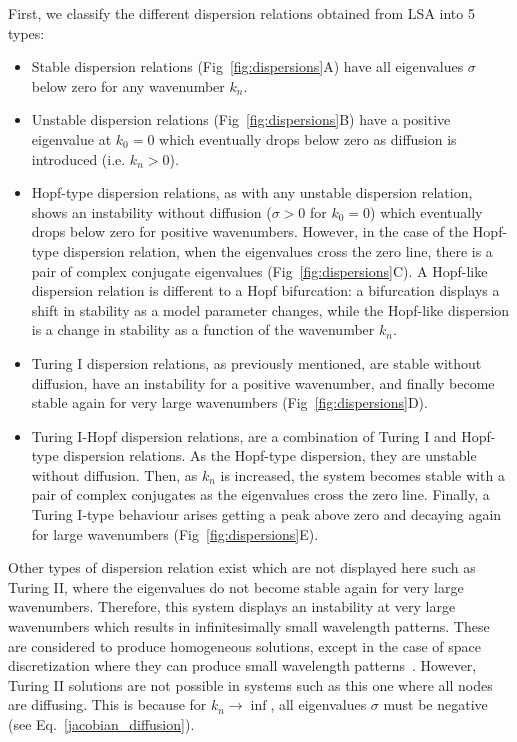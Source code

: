 First, we classify the different dispersion relations obtained from LSA into 5 types:
\begin{itemize}
    \item Stable dispersion relations (Fig~\ref{fig:dispersions}A) have all eigenvalues $\sigma$ below zero for any wavenumber $k_{n}$.
    \item Unstable dispersion relations (Fig~\ref{fig:dispersions}B) have a positive eigenvalue at $k_{0}=0$ which eventually drops below zero as diffusion is introduced (i.e. $k_{n}>0$).
    \item Hopf-type dispersion relations, as with any unstable dispersion relation, shows an instability without diffusion ($\sigma>0$ for $k_{0}=0$) which eventually drops below zero for positive wavenumbers.
However, in the case of the Hopf-type dispersion relation, when the eigenvalues cross the zero line, there is a pair of complex conjugate eigenvalues (Fig~\ref{fig:dispersions}C).
A Hopf-like dispersion relation is different to a Hopf bifurcation: a bifurcation displays a shift in stability as a model parameter changes, while the Hopf-like dispersion is a change in stability as a function of the wavenumber $k_{n}$.
\item Turing I dispersion relations, as previously mentioned, are stable without diffusion, have an instability for a positive wavenumber, and finally become stable again for very large wavenumbers (Fig~\ref{fig:dispersions}D).
    \item Turing I-Hopf dispersion relations, are a combination of Turing I and Hopf-type dispersion relations.
As the Hopf-type dispersion, they are unstable without diffusion.
Then, as $k_{n}$ is increased, the system becomes stable with a pair of complex conjugates as the eigenvalues cross the zero line.
Finally, a Turing I-type behaviour arises getting a peak above zero and decaying again for large wavenumbers (Fig~\ref{fig:dispersions}E).
\end{itemize}
Other types of dispersion relation exist which are not displayed here such as Turing II, where the eigenvalues do not become stable again for very large wavenumbers.
Therefore, this system displays an instability at very large wavenumbers which results in infinitesimally small wavelength patterns.
These are considered to produce homogeneous solutions, except in the case of space discretization where they can produce small wavelength patterns~\parencite{Wang2022}.
However, Turing II solutions are not possible in systems such as this one where all nodes are diffusing.
This is because for $k_n \rightarrow \inf$, all eigenvalues $\sigma$ must be negative (see Eq.~\ref{jacobian_diffusion}).


